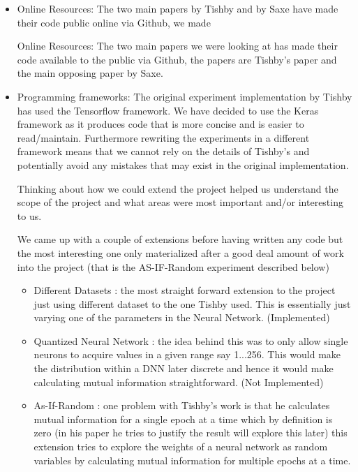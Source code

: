 \begin{itemize}
  \item{
      Online Resources: The two main papers by Tishby and by Saxe have made
      their code public online via Github, we made 

      Online Resources: The two main papers we were looking at has made their
      code available to the public via Github, the papers are Tishby's paper and
      the main opposing paper by Saxe.
    }
  \item{
      Programming frameworks: The original experiment implementation by Tishby
      has used the Tensorflow framework. We have decided to use the Keras
      framework as it produces code that is more concise and is easier to
      read/maintain. Furthermore rewriting the experiments in a different
      framework means that we cannot rely on the details of Tishby's and
      potentially avoid any mistakes that may exist in the original
      implementation.
    }
    \begin{item}

      Thinking about how we could extend the project helped us understand the
      scope of the project and what areas were most important and/or interesting
      to us. 

      We came up with a couple of extensions before having written any code but
      the most interesting one only materialized after a good deal amount of
      work into the project (that is the AS-IF-Random experiment described
      below)

      \begin{itemize}
        \item{
            Different Datasets : the most straight forward extension to the
            project just using different dataset to the one Tishby used. This is
            essentially just varying one of the parameters in the Neural
            Network. (Implemented)
          }
        \item{
            Quantized Neural Network : the idea behind this was to only allow
            single neurons to acquire values in a given range say 1...256. This
            would make the distribution within a DNN later discrete and hence it
            would make calculating mutual information straightforward. (Not
            Implemented)
          }
        \item{
            As-If-Random : one problem with Tishby's work is that he calculates
            mutual information for a single epoch at a time which by definition
            is zero (in his paper he tries to justify the result will explore
            this later) this extension tries to explore the weights of a neural
            network as random variables by calculating mutual information for
            multiple epochs at a time.
          }
      \end{itemize}
    \end{item}
\end{itemize}



